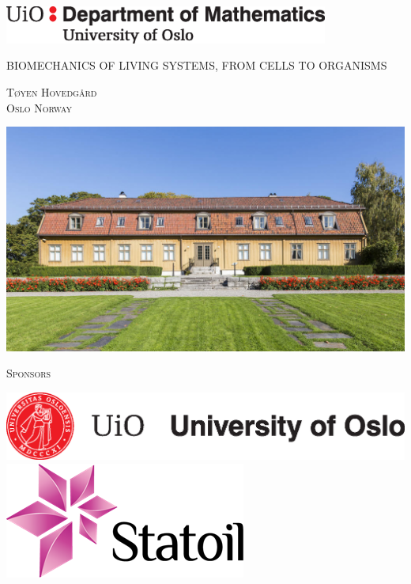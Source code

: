 \documentclass{article}
\begin{document}
\newenvironment{changemargin}[2]{%
\begin{list}{}{%
\setlength{\topsep}{0pt}%
\setlength{\leftmargin}{#1}%
\setlength{\rightmargin}{#2}%
\setlength{\listparindent}{\parindent}%
\setlength{\itemindent}{\parindent}%
\setlength{\parsep}{\parskip}%
}%
\item[]}{\end{list}}

\begin{titlepage}
	\centering
	\includegraphics[width=0.8\textwidth]{img/mat-mn-navn-eng.eps}\par\vspace{1cm}
	{\scshape\LARGE BIOMECHANICS OF LIVING SYSTEMS, FROM CELLS TO ORGANISMS \par}
	\vspace{1cm}
	{\scshape\Large Tøyen Hovedgård \\ Oslo Norway\par}
	\vspace{1.5cm}

\begin{changemargin}{-1cm}{-1cm}

\includegraphics[scale=0.4]{img/hoved.jpg}

\centering
\vspace{0.5cm}
{\scshape\Large  Sponsors}
\vspace{0.5cm}



\includegraphics[scale=0.45]{01-UiO-Hovedlogo/English/UiO_Seal_B_ENG_cmyk.eps}\hspace*{2cm}
\includegraphics[scale=0.45]{img/logo.png}
\end{changemargin}


\end{titlepage}
\end{document}

